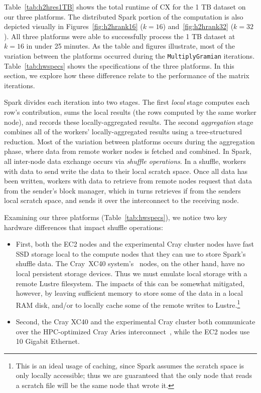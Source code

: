 Table~\ref{tab:h2hres1TB} shows the total runtime of CX for the 1 TB dataset on our three platforms.  The distributed Spark portion of the computation is also depicted visually in Figures~\ref{fig:h2hrank16} ($k=16$) and~\ref{fig:h2hrank32} ($k=32$).  All three platforms were able to successfully process the 1 TB dataset at $k=16$ in under 25 minutes.  As the table and figures illustrate, most of the variation between the platforms occurred during the \texttt{MultiplyGramian} iterations.  Table~\ref{tab:hwspecs} shows the specifications of the three platforms. In this section, we explore how these difference relate to the performance of the matrix iterations.

Spark divides each iteration into two stages.  The first \emph{local} stage computes each row's contribution, sums the local results (the rows computed by the same worker node), and records these locally-aggregated results.  The second \emph{aggregation} stage combines all of the workers' locally-aggregated results using a tree-structured reduction.  Most of the variation between platforms occurs during the aggregation phase, where data from remote worker nodes is fetched and combined.  In Spark, all inter-node data exchange occurs via \emph{shuffle operations}.  In a shuffle, workers with data to send write the data to their local scratch space.  Once all data has been written, workers with data to retrieve from remote nodes request that data from the sender's block manager, which in turns retrieves if from the senders local scratch space, and sends it over the interconnect to the receiving node.

Examining our three platforms (Table~\ref{tab:hwspecs}), we notice two key hardware differences that impact shuffle operations:
\begin{itemize}
\item First, both the EC2 nodes and the experimental Cray cluster nodes have fast SSD storage local to the compute nodes that they can use to store Spark's shuffle data.  
The Cray{\textsuperscript{\tiny\textregistered}}~XC40{\textsuperscript{\tiny\texttrademark}} system's~\cite{alverson2012cray,craycascadesc12} nodes, on the other hand, have no local persistent storage devices.  Thus we must emulate local storage with a remote Lustre filesystem.  The impacts of this can be somewhat mitigated, however, by leaving sufficient memory to store some of the data in a local RAM disk, and/or to locally cache some of the remote writes to Lustre.\footnote{This is an ideal usage of caching, since Spark assumes the scratch space is only locally accessible; thus we are guaranteed that the only node that reads a scratch file will be the same node that wrote it.}
\item Second, the Cray XC40 and the experimental Cray cluster both communicate over the HPC-optimized Cray Aries 
interconnect~\cite{alverson2012cray,craycascadesc12}, while the EC2 nodes use 10 Gigabit Ethernet.
\end{itemize}  

